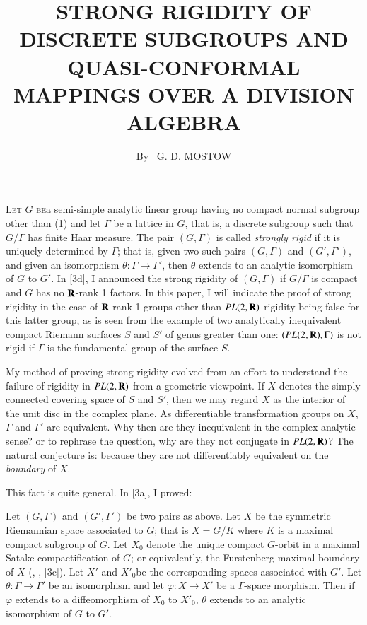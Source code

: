 
\title{STRONG RIGIDITY OF DISCRETE SUBGROUPS AND QUASI-CONFORMAL MAPPINGS OVER A DIVISION ALGEBRA}

\author{By~ G. D. MOSTOW}

\date{}
\maketitle


\setcounter{pageoriginal}{202}

\textsc{Let $G$ be}\pageoriginale a semi-simple analytic linear group having no compact normal subgroup other than (1) and let $\Gamma$ be a lattice in $G$, that is, a discrete subgroup such that $G/\Gamma$ has finite Haar measure. The pair $(G, \Gamma)$ is called \textit{strongly rigid} if it is uniquely determined by $\Gamma$; that is, given two such pairs $(G, \Gamma)$  and $(G',\Gamma')$, and given an isomorphism $\theta: \Gamma \to \Gamma'$, then $\theta$ extends to an analytic isomorphism of $G$ to $G'$. In [3d], I announced the strong rigidity of $(G,\Gamma)$ if $G/\Gamma$ is compact and $G$ has no $\mathbf{R}$-rank 1 factors. In this paper, I will indicate the proof of strong rigidity in the case of $\mathbf{R}$-rank 1 groups other than $PL (2, \mathbf{R})$-rigidity being false for this latter group, as is seen from the example of two analytically inequivalent compact Riemann surfaces $S$ and $S'$ of genus greater than one: $(PL (2, \mathbf{R}), \Gamma)$ is not rigid if $\Gamma$ is the fundamental group of the surface $S$.

My method of proving strong rigidity evolved from an effort to understand the failure of rigidity in $PL(2, \mathbf{R})$ from a geometric viewpoint. If $X$ denotes the simply connected covering space of $S$ and $S'$, then we may regard $X$ as the interior of the unit disc in the complex plane. As differentiable transformation groups on $X$, $\Gamma$ and $\Gamma'$ are equivalent. Why then are they inequivalent in the complex analytic sense? or to rephrase the question, why are they not conjugate in $PL (2,\mathbf{R})$? The natural conjecture is: because they are not differentiably equivalent on the \textit{boundary} of $X$.

This fact is quite general. In [3a], I proved:

Let $(G,\Gamma)$ and $(G', \Gamma')$ be two pairs as above. Let $X$ be the symmetric Riemannian space associated to $G$; that is $X = G/ K$ where $K$ is a maximal compact subgroup of $G$. Let $X_0$ denote the unique compact $G$-orbit in a maximal Satake compactification of $G$; or equivalently, the Furstenberg maximal boundary of $X$ (\cf \cite{art7-key1}, \cite{art7-key5}, [3c]). Let $X'$ and $X'_0$\pageoriginale be the corresponding spaces associated with $G'$. Let $\theta: \Gamma \to \Gamma'$ be an isomorphism and let $\varphi: X \to X'$ be a $\Gamma$-space morphism. Then if $\varphi$ extends to a diffeomorphism of $X_0$ to $X'_0$, $\theta$ extends to an analytic isomorphism of $G$ to $G'$.

